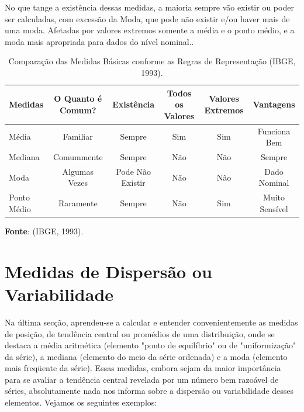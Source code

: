 \inic No que tange a existência dessas medidas, a maioria sempre vão existir ou poder ser calculadas, com excessão da Moda, que pode não existir e/ou haver mais de uma moda. Afetadas por valores extremos somente a média e o ponto médio, e a moda mais apropriada para dados do nível nominal..

\begin{table}
\centering
    {
\caption{Comparação das Medidas Básicas conforme as Regras de Representação (IBGE, 1993).}
\label{tabelarotacionada2}
    \vspace{0.2cm}
\begin{tabular}{l|c|c|c|c|c}
\hline
   Medidas  & O Quanto é Comum? & Existência        & Todos os Valores & Valores Extremos & Vantagens      \\
\hline\hline
   Média    & Familiar          & Sempre            & Sim              & Sim              & Funciona Bem    \\
   Mediana  & Comummente        & Sempre            & Não              & Não              & Sempre          \\
   Moda     & Algumas Vezes     & Pode Não Existir  & Não              & Não              & Dado Nominal    \\ 
Ponto Médio & Raramente         & Sempre            & Não              & Sim              & Muito Sensível  \\  
   \hline\hline 
\end{tabular}} 
\vspace{-1.5cm}
\textbf{Fonte}: (IBGE, 1993). 
\end{table}



\newpage
\section{Medidas de Dispersão ou Variabilidade}


Na última secção, aprendeu-se a calcular e entender convenientemente as medidas de posição, de tendência central ou promédios de uma distribuição, onde se destaca a média aritmética (elemento "ponto de equilíbrio" ou de "uniformização" da série), a mediana (elemento do meio da série ordenada) e a moda (elemento mais freqüente da série). Essas medidas, embora sejam da maior importância para se avaliar a tendência central revelada por um número bem razoável de séries, absolutamente nada nos informa sobre a dispersão ou variabilidade desses elementos.  Vejamos os seguintes exemplos:\vskip0.3cm

